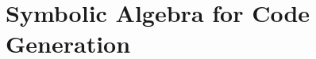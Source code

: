 \documentclass[tikz]{beamer}
\begin{document}




  




\section{Symbolic Algebra for Code Generation}
\end{document}
